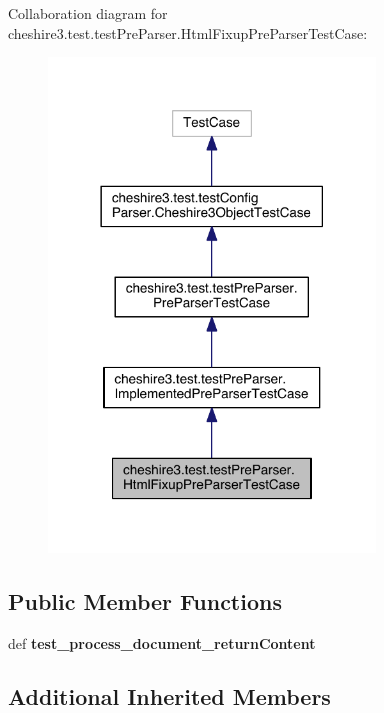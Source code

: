 Collaboration diagram for cheshire3.\-test.\-test\-Pre\-Parser.\-Html\-Fixup\-Pre\-Parser\-Test\-Case\-:
\nopagebreak
\begin{figure}[H]
\begin{center}
\leavevmode
\includegraphics[width=246pt]{classcheshire3_1_1test_1_1test_pre_parser_1_1_html_fixup_pre_parser_test_case__coll__graph}
\end{center}
\end{figure}
\subsection*{Public Member Functions}
\begin{DoxyCompactItemize}
\item 
\hypertarget{classcheshire3_1_1test_1_1test_pre_parser_1_1_html_fixup_pre_parser_test_case_a284140025547913827396ad6233d1580}{def {\bfseries test\-\_\-process\-\_\-document\-\_\-return\-Content}}\label{classcheshire3_1_1test_1_1test_pre_parser_1_1_html_fixup_pre_parser_test_case_a284140025547913827396ad6233d1580}

\end{DoxyCompactItemize}
\subsection*{Additional Inherited Members}



